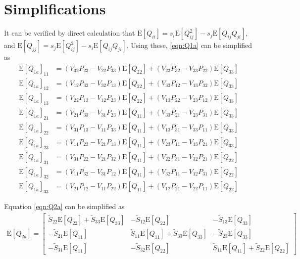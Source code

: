 \documentclass[10pt]{article}
\newcommand{\expect}[1]{\ensuremath{\mathrm{E}\left[ #1 \right]}}
\begin{document}
\section{Simplifications}
It can be verified by direct calculation that $\expect{Q_{ii}} = s_i\expect{Q_{ij}^2}-s_j\expect{Q_{ij}Q_{ji}}$, and $\expect{Q_{jj}} = s_j\expect{Q_{ij}^2}-s_i\expect{Q_{ij}Q_{ji}}$.
Using these, \eqref{eqn:Q1a} can be simplified as
\begin{align}
	\expect{Q_{1a}}_{11} &= (V_{32}P_{23}-V_{22}P_{33})\expect{Q_{22}} + (V_{23}P_{32}-V_{33}P_{22})\expect{Q_{33}} \nonumber \\
	\expect{Q_{1a}}_{12} &= (V_{12}P_{33}-V_{32}P_{13})\expect{Q_{22}} + 
	(V_{33}P_{12}-V_{13}P_{32})\expect{Q_{33}} \nonumber \\
	\expect{Q_{1a}}_{13} &= (V_{22}P_{13}-V_{12}P_{23})\expect{Q_{22}} + (V_{13}P_{22}-V_{23}P_{12})\expect{Q_{33}} \nonumber \\
	\expect{Q_{1a}}_{21} &= (V_{21}P_{33}-V_{31}P_{23})\expect{Q_{11}} + (V_{33}P_{21}-V_{23}P_{31})\expect{Q_{33}} \nonumber \\
	\expect{Q_{1a}}_{22} &= (V_{31}P_{13}-V_{11}P_{33})\expect{Q_{11}} + (V_{13}P_{31}-V_{33}P_{11})\expect{Q_{33}} \nonumber \\
	\expect{Q_{1a}}_{23} &= (V_{11}P_{23}-V_{21}P_{13})\expect{Q_{11}} + (V_{23}P_{11}-V_{13}P_{21})\expect{Q_{33}} \nonumber \\
	\expect{Q_{1a}}_{31} &= (V_{31}P_{22}-V_{21}P_{32})\expect{Q_{11}} + (V_{22}P_{31}-V_{32}P_{21})\expect{Q_{22}} \nonumber \\
	\expect{Q_{1a}}_{32} &= (V_{11}P_{32}-V_{31}P_{12})\expect{Q_{11}} + (V_{32}P_{11}-V_{12}P_{31})\expect{Q_{22}} \nonumber \\
	\expect{Q_{1a}}_{33} &= (V_{21}P_{12}-V_{11}P_{22})\expect{Q_{11}} + (V_{12}P_{21}-V_{22}P_{11})\expect{Q_{22}}
\end{align}

Equation \eqref{eqn:Q2a} can be simplified as
\begin{align}
	\expect{Q_{2a}} = \begin{bmatrix}
		\tilde{S}_{22}\expect{Q_{22}} + \tilde{S}_{33}\expect{Q_{33}} & -\tilde{S}_{12}\expect{Q_{22}} & -\tilde{S}_{13}\expect{Q_{33}} \\
		-\tilde{S}_{21}\expect{Q_{11}} & \tilde{S}_{11}\expect{Q_{11}} + \tilde{S}_{33}\expect{Q_{33}} & -\tilde{S}_{23}\expect{Q_{33}} \\
		-\tilde{S}_{31}\expect{Q_{11}} & -\tilde{S}_{32}\expect{Q_{22}} & \tilde{S}_{11}\expect{Q_{11}} + \tilde{S}_{22}\expect{Q_{22}}
	\end{bmatrix}
\end{align}
\end{document}
